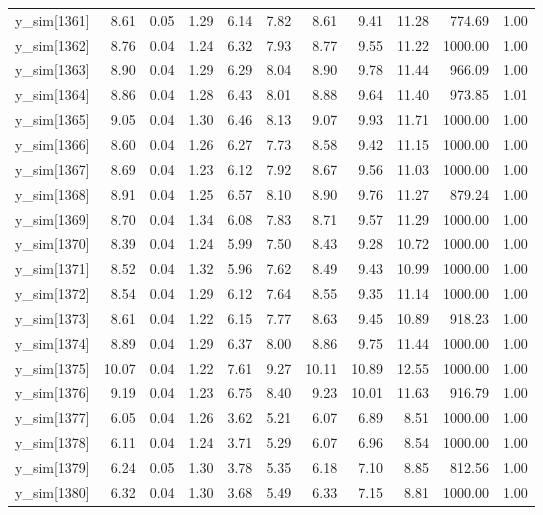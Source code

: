 \begin{table}[ht]
\begin{tabular}{rrrrrrrrrrr}
  y\_sim[1361] & 8.61 & 0.05 & 1.29 & 6.14 & 7.82 & 8.61 & 9.41 & 11.28 & 774.69 & 1.00 \\ 
  y\_sim[1362] & 8.76 & 0.04 & 1.24 & 6.32 & 7.93 & 8.77 & 9.55 & 11.22 & 1000.00 & 1.00 \\ 
  y\_sim[1363] & 8.90 & 0.04 & 1.29 & 6.29 & 8.04 & 8.90 & 9.78 & 11.44 & 966.09 & 1.00 \\ 
  y\_sim[1364] & 8.86 & 0.04 & 1.28 & 6.43 & 8.01 & 8.88 & 9.64 & 11.40 & 973.85 & 1.01 \\ 
  y\_sim[1365] & 9.05 & 0.04 & 1.30 & 6.46 & 8.13 & 9.07 & 9.93 & 11.71 & 1000.00 & 1.00 \\ 
  y\_sim[1366] & 8.60 & 0.04 & 1.26 & 6.27 & 7.73 & 8.58 & 9.42 & 11.15 & 1000.00 & 1.00 \\ 
  y\_sim[1367] & 8.69 & 0.04 & 1.23 & 6.12 & 7.92 & 8.67 & 9.56 & 11.03 & 1000.00 & 1.00 \\ 
  y\_sim[1368] & 8.91 & 0.04 & 1.25 & 6.57 & 8.10 & 8.90 & 9.76 & 11.27 & 879.24 & 1.00 \\ 
  y\_sim[1369] & 8.70 & 0.04 & 1.34 & 6.08 & 7.83 & 8.71 & 9.57 & 11.29 & 1000.00 & 1.00 \\ 
  y\_sim[1370] & 8.39 & 0.04 & 1.24 & 5.99 & 7.50 & 8.43 & 9.28 & 10.72 & 1000.00 & 1.00 \\ 
  y\_sim[1371] & 8.52 & 0.04 & 1.32 & 5.96 & 7.62 & 8.49 & 9.43 & 10.99 & 1000.00 & 1.00 \\ 
  y\_sim[1372] & 8.54 & 0.04 & 1.29 & 6.12 & 7.64 & 8.55 & 9.35 & 11.14 & 1000.00 & 1.00 \\ 
  y\_sim[1373] & 8.61 & 0.04 & 1.22 & 6.15 & 7.77 & 8.63 & 9.45 & 10.89 & 918.23 & 1.00 \\ 
  y\_sim[1374] & 8.89 & 0.04 & 1.29 & 6.37 & 8.00 & 8.86 & 9.75 & 11.44 & 1000.00 & 1.00 \\ 
  y\_sim[1375] & 10.07 & 0.04 & 1.22 & 7.61 & 9.27 & 10.11 & 10.89 & 12.55 & 1000.00 & 1.00 \\ 
  y\_sim[1376] & 9.19 & 0.04 & 1.23 & 6.75 & 8.40 & 9.23 & 10.01 & 11.63 & 916.79 & 1.00 \\ 
  y\_sim[1377] & 6.05 & 0.04 & 1.26 & 3.62 & 5.21 & 6.07 & 6.89 & 8.51 & 1000.00 & 1.00 \\ 
  y\_sim[1378] & 6.11 & 0.04 & 1.24 & 3.71 & 5.29 & 6.07 & 6.96 & 8.54 & 1000.00 & 1.00 \\ 
  y\_sim[1379] & 6.24 & 0.05 & 1.30 & 3.78 & 5.35 & 6.18 & 7.10 & 8.85 & 812.56 & 1.00 \\ 
  y\_sim[1380] & 6.32 & 0.04 & 1.30 & 3.68 & 5.49 & 6.33 & 7.15 & 8.81 & 1000.00 & 1.00 \\ 

\end{tabular}
\end{table}
